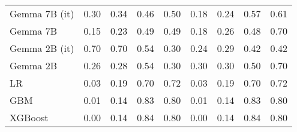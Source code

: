 \begin{tabular}{lllllllll}
Gemma 7B (it) & 0.30 & 0.34 & \cellcolor{orange!14.6} 0.46 & 0.50 & 0.18 & 0.24 & 0.57 & 0.61 \\
Gemma 7B & 0.15 & \cellcolor{cyan!3.4} 0.23 & 0.49 & 0.49 & 0.18 & 0.26 & 0.48 & 0.70 \\
Gemma 2B (it) & \cellcolor{orange!25.0} 0.70 & \cellcolor{orange!25.0} 0.70 & 0.54 & \cellcolor{orange!25.0} 0.30 & 0.24 & \cellcolor{orange!14.2} 0.29 & \cellcolor{orange!25.0} 0.42 & 0.42 \\
Gemma 2B & 0.26 & 0.28 & 0.54 & \cellcolor{orange!25.0} 0.30 & \cellcolor{orange!25.0} 0.30 & \cellcolor{orange!25.0} 0.30 & 0.50 & 0.70 \\
LR & 0.03 & 0.19 & 0.70 & 0.72 & 0.03 & 0.19 & 0.70 & 0.72 \\
GBM & 0.01 & 0.14 & 0.83 & 0.80 & 0.01 & 0.14 & 0.83 & 0.80 \\
XGBoost & 0.00 & 0.14 & 0.84 & 0.80 & 0.00 & 0.14 & 0.84 & 0.80 \\
\bottomrule
\end{tabular}


